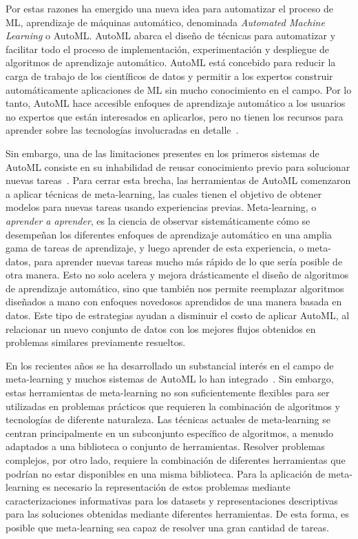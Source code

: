\documentclass[a4paper,12pt]{article}
\begin{document}
Por estas razones ha emergido una nueva idea para automatizar el proceso de ML, aprendizaje de máquinas automático, denominada \textit{Automated Machine Learning} o AutoML. AutoML abarca el diseño de técnicas para automatizar y facilitar todo el proceso de implementación, experimentación y despliegue de algoritmos de aprendizaje automático. AutoML está concebido para reducir la carga de trabajo de los científicos de datos y permitir a los expertos construir automáticamente aplicaciones de ML sin mucho conocimiento en el campo. Por lo tanto, AutoML hace accesible enfoques de aprendizaje automático a los usuarios no expertos que están interesados en aplicarlos, pero no tienen los recursos para aprender sobre las tecnologías involucradas en detalle~\cite{hutter2019autmlbook}.

Sin embargo, una de las limitaciones presentes en los primeros sistemas de AutoML consiste en su inhabilidad de reusar conocimiento previo para solucionar nuevas tareas~\cite{dyrmishi2019decision}. Para cerrar esta brecha, las herramientas de AutoML comenzaron a aplicar técnicas de meta-learning, las cuales tienen el objetivo de obtener modelos para nuevas tareas usando experiencias previas. Meta-learning, o \textit{aprender a aprender}, es la ciencia de observar sistemáticamente cómo se desempeñan los diferentes enfoques de aprendizaje automático en una amplia gama de tareas de aprendizaje, y luego aprender de esta experiencia, o meta-datos, para aprender nuevas tareas mucho más rápido de lo que sería posible de otra manera. Esto no solo acelera y mejora drásticamente el diseño de algoritmos de aprendizaje automático, sino que también nos permite reemplazar algoritmos diseñados a mano con enfoques novedosos aprendidos de una manera basada en datos. Este tipo de estrategias ayudan a disminuir el costo de aplicar AutoML, al relacionar un nuevo conjunto de datos con los mejores flujos obtenidos en problemas similares previamente resueltos. 

En los recientes años se ha desarrollado un substancial interés en el campo de meta-learning y muchos sistemas de AutoML lo han integrado~\cite{fuerer2015efficient, maher2019smartml, drori2018alphad3m, yang2018oboe, zimmer2021auto, Feurer2020AutoSklearn2T}. Sin embargo, estas herramientas de meta-learning no son suficientemente flexibles para ser utilizadas en problemas prácticos que requieren la combinación de algoritmos y tecnologías de diferente naturaleza. Las técnicas actuales de meta-learning se centran principalmente en un subconjunto específico de algoritmos, a menudo adaptados a una biblioteca o conjunto de herramientas. Resolver problemas complejos, por otro lado, requiere la combinación de diferentes herramientas que podrían no estar disponibles en una misma biblioteca. Para la aplicación de meta-learning es necesario la representación de estos problemas mediante caracterizaciones informativas para los datasets y representaciones descriptivas para las soluciones obtenidas mediante diferentes herramientas. De esta forma, es posible que meta-learning sea capaz de resolver una gran cantidad de tareas.
\end{document}

